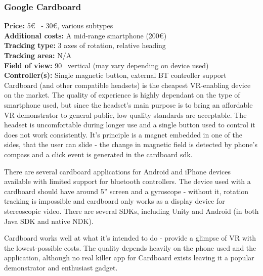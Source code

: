 \documentclass[12pt, a4paper]{article}
\begin{document}
\subsubsection{Google Cardboard}
\vspace*{-5mm}
\textbf{Price:} 5\euro~ - 30\euro, various subtypes\\
\textbf{Additional costs:} A mid-range smartphone (200\euro)\\
\textbf{Tracking type:} 3 axes of rotation, relative heading\\
\textbf{Tracking area:} N/A\\
\textbf{Field of view:} 90\degree~ vertical (may vary depending on device used)\\
\textbf{Controller(s):} Single magnetic button, external BT controller support \bigskip \\
Cardboard (and other compatible headsets) is the cheapest VR-enabling device on the market. The quality of experience is highly dependant on the type of smartphone used, but since the headset’s main purpose is to bring an affordable VR demonstrator to general public, low quality standards are acceptable. The headset is uncomfortable during longer use and a single button used to control it does not work consistently. It’s principle is a magnet embedded in one of the sides, that the user can slide - the change in magnetic field is detected by phone’s compass and a click event is generated in the cardboard sdk.

There are several cardboard applications for Android and iPhone devices available with limited support for bluetooth controllers. The device used with a cardboard should have around 5'' screen and a gyroscope - without it, rotation tracking is impossible and cardboard only works as a display device for stereoscopic video. There are several SDKs, including Unity and Android (in both Java SDK and native NDK).

Cardboard works well at what it’s intended to do - provide a glimpse of VR with the lowest-possible costs. The quality depends heavily on the phone used and the application, although no real killer app for Cardboard exists leaving it a popular demonstrator and enthusiast gadget.
\end{document}
